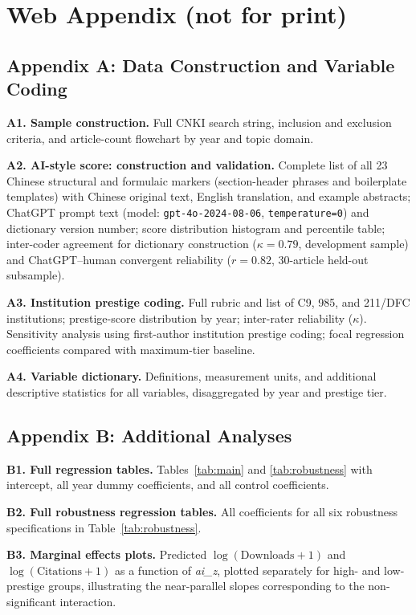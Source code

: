 \documentclass[12pt,a4paper]{article}
\begin{document}
\newpage
\section*{Web Appendix (not for print)}

\subsection*{Appendix A: Data Construction and Variable Coding}

\textbf{A1. Sample construction.}
Full CNKI search string, inclusion and exclusion criteria, and
article-count flowchart by year and topic domain.

\textbf{A2. AI-style score: construction and validation.}
Complete list of all 23 Chinese structural and formulaic markers
(section-header phrases and boilerplate templates) with Chinese
original text, English translation, and example abstracts;
ChatGPT prompt text (model: \texttt{gpt-4o-2024-08-06},
\texttt{temperature=0}) and dictionary version number;
score distribution histogram and percentile table;
inter-coder agreement for dictionary construction ($\kappa=0.79$,
development sample) and ChatGPT--human convergent reliability
($r=0.82$, 30-article held-out subsample).

\textbf{A3. Institution prestige coding.}
Full rubric and list of C9, 985, and 211/DFC institutions;
prestige-score distribution by year; inter-rater reliability ($\kappa$).
Sensitivity analysis using first-author institution prestige coding;
focal regression coefficients compared with maximum-tier baseline.

\textbf{A4. Variable dictionary.}
Definitions, measurement units, and additional descriptive statistics
for all variables, disaggregated by year and prestige tier.

\subsection*{Appendix B: Additional Analyses}

\textbf{B1. Full regression tables.}
Tables~\ref{tab:main} and \ref{tab:robustness} with intercept,
all year dummy coefficients, and all control coefficients.

\textbf{B2. Full robustness regression tables.}
All coefficients for all six robustness specifications in
Table~\ref{tab:robustness}.

\textbf{B3. Marginal effects plots.}
Predicted $\log(\text{Downloads}+1)$ and $\log(\text{Citations}+1)$
as a function of \textit{ai\_z}, plotted separately for high- and
low-prestige groups, illustrating the near-parallel slopes corresponding
to the non-significant interaction.
\end{document}

